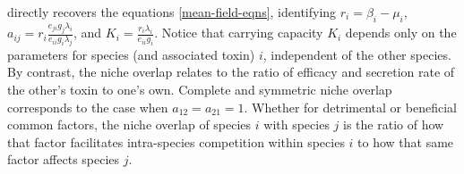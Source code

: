 \documentclass[a4paper,10pt]{article}
\numberwithin{equation}{section} %
\begin{document}
directly recovers the equations \ref{mean-field-eqns}, %
identifying $r_i=\beta_i-\mu_i$, $a_{ij} = r_i \frac{e_{ji} g_j \lambda_i}{e_{ii} g_i \lambda_j}$, and $K_i = \frac{r_i \lambda_i}{e_{ii} g_i}$. 
Notice that carrying capacity $K_i$ depends only on the parameters for species (and associated toxin) $i$, independent of the other species. 
By contrast, the niche overlap relates to the ratio of efficacy and secretion rate of the other's toxin to one's own. 
Complete and symmetric niche overlap corresponds to the case when $a_{12} = a_{21} = 1$. 
Whether for detrimental or beneficial common factors, the niche overlap of species $i$ with species $j$ is the ratio of how that factor facilitates intra-species competition within species $i$ to how that same factor affects species $j$. 
\end{document}

